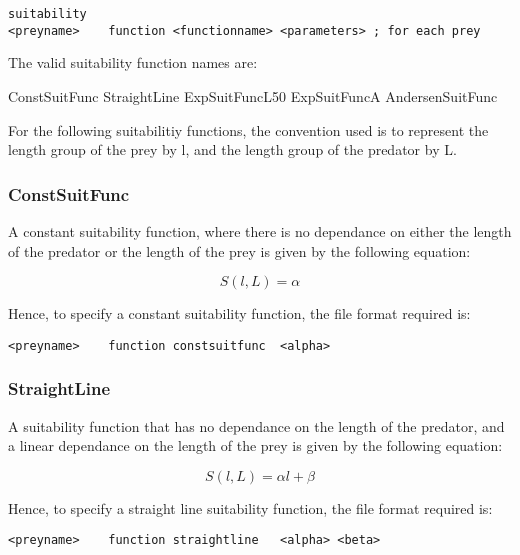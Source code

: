 \documentclass [a4paper, 10pt]{book}
\begin{document}
\begin{verbatim}
suitability
<preyname>    function <functionname> <parameters> ; for each prey
\end{verbatim}

The valid suitability function names are:\newline

ConstSuitFunc\newline
StraightLine\newline
ExpSuitFuncL50\newline
ExpSuitFuncA\newline
AndersenSuitFunc

\bigskip
For the following suitabilitiy functions, the convention used is to represent the length group of the prey by l, and the length group of the predator by L.

\subsubsection{ConstSuitFunc}
A constant suitability function, where there is no dependance on either the length of the predator or the length of the prey is given by the following equation:

\begin{equation}\label{eq:constsuit}
S(l,L) = \alpha
\end{equation}

Hence, to specify a constant suitability function, the file format required is:

\begin{verbatim}
<preyname>    function constsuitfunc  <alpha>
\end{verbatim}

\subsubsection{StraightLine}
A suitability function that has no dependance on the length of the predator, and a linear dependance on the length of the prey is given by the following equation:

\begin{equation}\label{eq:straightsuit}
S(l,L) = \alpha l + \beta
\end{equation}

\bigskip
Hence, to specify a straight line suitability function, the file format required is:

\begin{verbatim}
<preyname>    function straightline   <alpha> <beta>
\end{verbatim}
\end{document}
